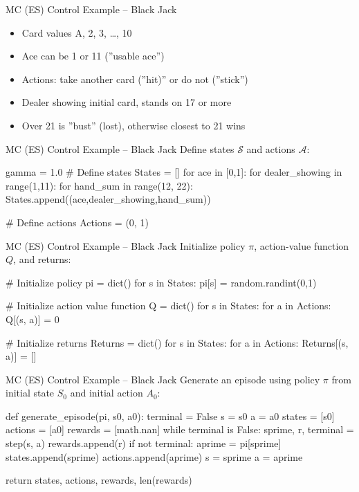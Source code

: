 \documentclass[ignorenonframetext,xcolor=x11names]{beamer}
\begin{document}
\begin{frame}{MC (ES) Control Example -- Black Jack}
\begin{itemize}
   \item Card values A, 2, 3, \ldots, 10
   \item Ace can be 1 or 11 (''usable ace'')
   \item Actions: take another card (''hit)'' or do not (''stick'')
   \item Dealer showing initial card, stands on 17 or more
   \item Over 21 is ''bust'' (lost), otherwise closest to 21 wins
\end{itemize}
\end{frame}

\begin{frame}[fragile]{MC (ES) Control Example -- Black Jack}
Define states $\mathcal{S}$ and actions $\mathcal{A}$:
\begin{pythoncode}
gamma = 1.0
# Define states
States = []
for ace in [0,1]:
    for dealer_showing in range(1,11):
        for hand_sum in range(12, 22):
            States.append((ace,dealer_showing,hand_sum))

# Define actions
Actions = (0, 1)
\end{pythoncode}
\end{frame}

\begin{frame}[fragile]{MC (ES) Control Example -- Black Jack}
Initialize policy $\pi$, action-value function $Q$, and returns:
\begin{pythoncode}
# Initialize policy
pi = dict()
for s in States:
    pi[s] = random.randint(0,1)

# Initialize action value function
Q = dict()
for s in States:
    for a in Actions:
        Q[(s, a)] = 0

# Initialize returns
Returns = dict()
for s in States:
    for a in Actions:
        Returns[(s, a)] = []
\end{pythoncode}
\end{frame}


\begin{frame}[fragile]{MC (ES) Control Example -- Black Jack}
Generate an episode using policy $\pi$ from initial state $S_0$ and initial action $A_0$:
\begin{pythoncode}
def generate_episode(pi, s0, a0):
    terminal = False
    s = s0
    a = a0
    states = [s0]
    actions = [a0]
    rewards = [math.nan]
    while terminal is False:
        sprime, r, terminal = step(s, a)
        rewards.append(r)
        if not terminal:
            aprime = pi[sprime]
            states.append(sprime)
            actions.append(aprime)
            s = sprime
            a = aprime

    return states, actions, rewards, len(rewards)
\end{pythoncode}
\end{frame}
\end{document}
